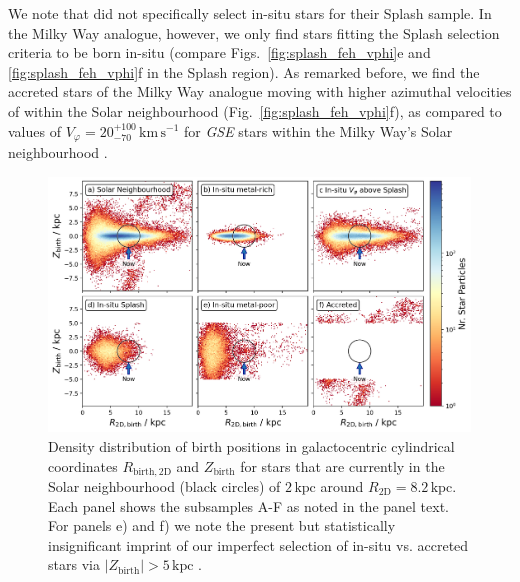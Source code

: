 \documentclass[fleqn,usenatbib]{mnras}
\begin{document}
We note that \citet{Belokurov2020} did not specifically select in-situ stars for their Splash sample. In the Milky Way analogue, however, we only find stars fitting the Splash selection criteria to be born in-situ (compare Figs.~\ref{fig:splash_feh_vphi}e and \ref{fig:splash_feh_vphi}f in the Splash region). As remarked before, we find the accreted stars of the Milky Way analogue moving with higher azimuthal velocities of  within the Solar neighbourhood (Fig.~\ref{fig:splash_feh_vphi}f), as compared to values of $V_\varphi = 20_{-70}^{+100}\,\mathrm{km\,s^{-1}}$ for \textit{GSE} stars within the Milky Way's Solar neighbourhood \citep{Buder2022}.

\begin{figure}
    \centering
    \includegraphics[width=0.997\textwidth]{figures/splash_rbirth_zbirth}
    \caption{Density distribution of birth positions in galactocentric cylindrical coordinates $R_\mathrm{birth, 2D}$ and $Z_\mathrm{birth}$ for stars that are currently in the Solar neighbourhood (black circles) of $2\,\mathrm{kpc}$ around $R_\mathrm{2D} = 8.2\,\mathrm{kpc}$. Each panel shows the subsamples A-F as noted in the panel text. For panels e) and f) we note the present but statistically insignificant imprint of our imperfect selection of in-situ vs. accreted stars via $\vert Z_\mathrm{birth} \vert > 5\,\mathrm{kpc}$  \href{https://github.com/svenbuder/gse_nihaouhd/tree/main/figures}{\faGithub}.}
    \label{fig:splash_rbirth_zbirth}
\end{figure}
\end{document}
